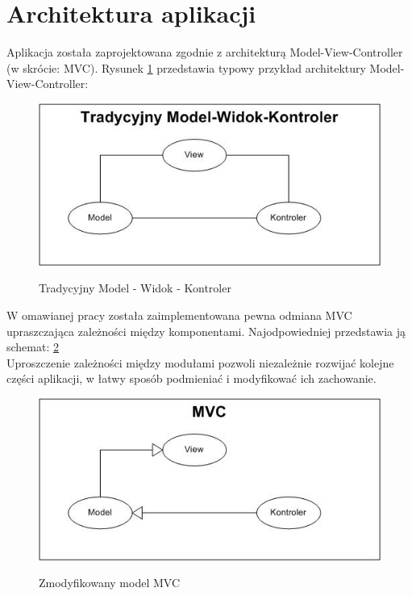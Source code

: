 \section {Architektura aplikacji}
Aplikacja została zaprojektowana zgodnie z architekturą Model-View-Controller (w skrócie: MVC).
Rysunek \ref{mvc tradycyjny} przedstawia typowy przykład architektury Model-View-Controller:\\
\begin{figure}
\begin {center}
\includegraphics{tradicionalMVC.jpg} \\
\caption { Tradycyjny Model - Widok - Kontroler}
\label {mvc tradycyjny}
\end {center}
\end{figure}
W omawianej pracy została zaimplementowana pewna odmiana MVC upraszczająca zależności między komponentami.
Najodpowiedniej przedstawia ją schemat: \ref{zmodyfikowany mvc}\\
Uproszczenie zależności między modułami pozwoli niezależnie rozwijać kolejne części aplikacji, w łatwy
sposób podmieniać i modyfikować ich zachowanie.
\begin{figure}
\begin {center}
\includegraphics{ourMVC.jpg} \\
\caption { Zmodyfikowany model MVC}
\label {zmodyfikowany mvc}
\end {center}
\end{figure}
